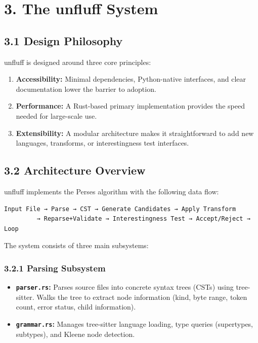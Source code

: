 \documentclass[
  letterpaper,
]{article}
\providecommand{\tightlist}{%
  \setlength{\itemsep}{0pt}\setlength{\parskip}{0pt}}
\begin{document}
\section{3. The unfluff System}\label{the-unfluff-system}

\subsection{3.1 Design Philosophy}\label{design-philosophy}

unfluff is designed around three core principles:

\begin{enumerate}
\def\labelenumi{\arabic{enumi}.}
\tightlist
\item
  \textbf{Accessibility:} Minimal dependencies, Python-native
  interfaces, and clear documentation lower the barrier to adoption.
\item
  \textbf{Performance:} A Rust-based primary implementation provides the
  speed needed for large-scale use.
\item
  \textbf{Extensibility:} A modular architecture makes it
  straightforward to add new languages, transforms, or interestingness
  test interfaces.
\end{enumerate}

\subsection{3.2 Architecture Overview}\label{architecture-overview}

unfluff implements the Perses algorithm with the following data flow:

\begin{verbatim}
Input File → Parse → CST → Generate Candidates → Apply Transform
         → Reparse+Validate → Interestingness Test → Accept/Reject → Loop
\end{verbatim}

The system consists of three main subsystems:

\subsubsection{3.2.1 Parsing Subsystem}\label{parsing-subsystem}

\begin{itemize}
\tightlist
\item
  \textbf{\texttt{parser.rs}:} Parses source files into concrete syntax
  trees (CSTs) using tree-sitter. Walks the tree to extract node
  information (kind, byte range, token count, error status, child
  information).
\item
  \textbf{\texttt{grammar.rs}:} Manages tree-sitter language loading,
  type queries (supertypes, subtypes), and Kleene node detection.
\end{itemize}
\end{document}
